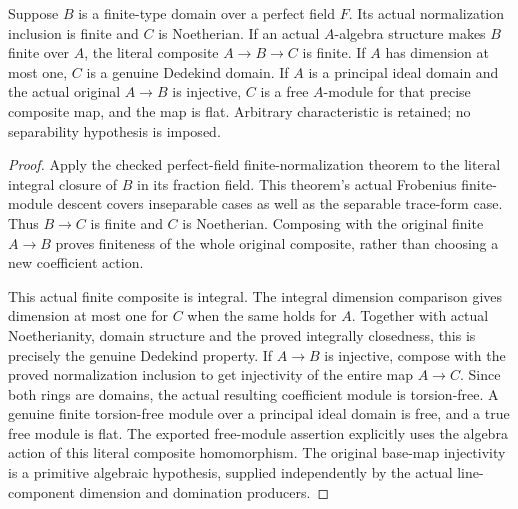 \begin{theorem}
\label{algebra:finite-free-curve-normalization}
\leanok
{}
Suppose $B$ is a finite-type domain over a perfect field $F$. Its
actual normalization inclusion is finite and $C$ is Noetherian.
If an actual $A$-algebra structure makes $B$ finite over $A$, the literal
composite $A\to B\to C$ is finite. If $A$ has dimension at most one,
$C$ is a genuine Dedekind domain. If $A$ is a principal ideal domain
and the actual original $A\to B$ is injective, $C$ is a free $A$-module
for that precise composite map, and the map is flat. Arbitrary
characteristic is retained; no separability hypothesis is imposed.
\end{theorem}
\begin{proof}
Apply the checked perfect-field finite-normalization theorem to the
literal integral closure of $B$ in its fraction field. This theorem's
actual Frobenius finite-module descent covers inseparable cases as
well as the separable trace-form case. Thus $B\to C$ is finite and
$C$ is Noetherian. Composing with the original finite $A\to B$ proves
finiteness of the whole original composite, rather than choosing a
new coefficient action.

This actual finite composite is integral. The integral dimension
comparison gives dimension at most one for $C$ when the same holds
for $A$. Together with actual Noetherianity, domain structure and the
proved integrally closedness, this is precisely the genuine Dedekind
property. If $A\to B$ is injective, compose with the proved normalization
inclusion to get injectivity of the entire map $A\to C$. Since both
rings are domains, the actual resulting coefficient module is
torsion-free. A genuine finite torsion-free module over a principal
ideal domain is free, and a true free module is flat. The exported
free-module assertion explicitly uses the algebra action of this
literal composite homomorphism. The original base-map injectivity
is a primitive algebraic hypothesis, supplied independently by the
actual line-component dimension and domination producers.
\end{proof}

